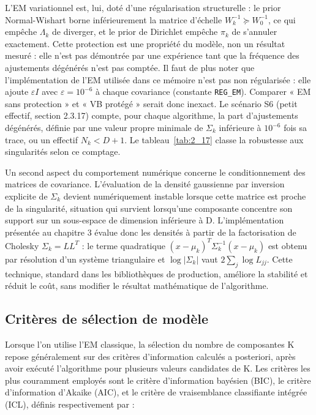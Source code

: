L'EM variationnel est, lui, doté d'une régularisation structurelle : le prior Normal-Wishart borne inférieurement la matrice d'échelle $W_k^{-1} \succeq W_0^{-1}$, ce qui empêche $\Lambda_k$ de diverger, et le prior de Dirichlet empêche $\pi_k$ de s'annuler exactement. Cette protection est une propriété du modèle, non un résultat mesuré : elle n'est pas démontrée par une expérience tant que la fréquence des ajustements dégénérés n'est pas comptée. Il faut de plus noter que l'implémentation de l'EM utilisée dans ce mémoire n'est pas non régularisée : elle ajoute $\varepsilon I$ avec $\varepsilon = 10^{-6}$ à chaque covariance (constante \texttt{REG\_EM}). Comparer « EM sans protection » et « VB protégé » serait donc inexact. Le scénario S6 (petit effectif, section 2.3.17) compte, pour chaque algorithme, la part d'ajustements dégénérés, définie par une valeur propre minimale de $\Sigma_k$ inférieure à $10^{-6}$ fois sa trace, ou un effectif $N_k < D+1$. Le tableau~\ref{tab:2_17} classe la robustesse aux singularités selon ce comptage.

Un second aspect du comportement numérique concerne le conditionnement des matrices de covariance. L'évaluation de la densité gaussienne par inversion explicite de $\Sigma _{k}$ devient numériquement instable lorsque cette matrice est proche de la singularité, situation qui survient lorsqu'une composante concentre son support sur un sous-espace de dimension inférieure à D. L'implémentation présentée au chapitre 3 évalue donc les densités à partir de la factorisation de Cholesky $\Sigma _{k} = LL^{T}$ : le terme quadratique $(x-\mu _{k})^{T}\Sigma _{k}^{-1}(x-\mu _{k})$ est obtenu par résolution d'un système triangulaire et $\log |\Sigma _{k}|$ vaut $2\sum _{j}\log L_{jj}$. Cette technique, standard dans les bibliothèques de production, améliore la stabilité et réduit le coût, sans modifier le résultat mathématique de l'algorithme.

\subsection{Critères de sélection de modèle}
Lorsque l'on utilise l'EM classique, la sélection du nombre de composantes K repose généralement sur des critères d'information calculés a posteriori, après avoir exécuté l'algorithme pour plusieurs valeurs candidates de K. Les critères les plus couramment employés sont le critère d'information bayésien (BIC), le critère d'information d'Akaike (AIC), et le critère de vraisemblance classifiante intégrée (ICL), définis respectivement par :

